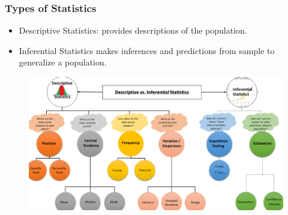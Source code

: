 \documentclass{beamer}
\begin{document}
\begin{frame}\frametitle{Types of Statistics}
\begin{itemize}
\item Descriptive Statistics: provides descriptions of the population.
\item Inferential Statistics makes inferences and predictions from sample to generalize a population. 
\end{itemize}

\begin{figure}
\includegraphics[scale=0.29]{DescriptiveInferential} 
\end{figure}
\end{frame}

\begin{frame}[plain]
\begin{figure}%
\end{figure}
\end{frame}
\end{document}
